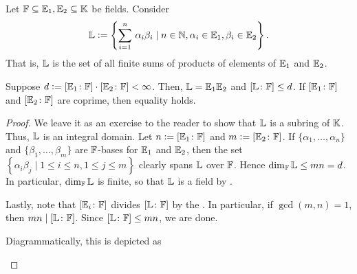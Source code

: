 \begin{prop}
    Let $\mathbb{F} \subseteq \mathbb{E}_1, \mathbb{E}_2 \subseteq \mathbb{K}$ be fields. Consider
    \[
        \mathbb{L} \vcentcolon= \left\{ \sum_{i=1}^n \, \alpha_i \beta_i \mid n \in \mathbb{N}, \alpha_i \in \mathbb{E}_1, \beta_i \in \mathbb{E}_2 \right\}.
    \]
    That is, $\mathbb{L}$ is the set of all finite sums of products of elements of $\mathbb{E}_1$ and $\mathbb{E}_2$.
    
    Suppose $d \vcentcolon= [\mathbb{E}_1 \colon \mathbb{F}] \cdot [\mathbb{E}_2 \colon \mathbb{F}] < \infty$. Then, $\mathbb{L} = \mathbb{E}_1\mathbb{E}_2$ and $[\mathbb{L} \colon \mathbb{F}] \leq d$. If $[\mathbb{E}_1 \colon \mathbb{F}]$ and $[\mathbb{E}_2 \colon \mathbb{F}]$ are coprime, then equality holds.
\end{prop}

\begin{proof}
    We leave it as an exercise to the reader to show that $\mathbb{L}$ is a subring of $\mathbb{K}$. Thus, $\mathbb{L}$ is an integral domain. Let $n \vcentcolon= [\mathbb{E}_1 \colon \mathbb{F}]$ and $m \vcentcolon= [\mathbb{E}_2 \colon \mathbb{F}]$. If $\{\alpha_1, \ldots, \alpha_n\}$ and $\{\beta_1, \ldots, \beta_m\}$ are $\mathbb{F}$-bases for $\mathbb{E}_1$ and $\mathbb{E}_2$, then the set $\left\{ \alpha_i \beta_j \mid 1 \leq i \leq n, 1 \leq j \leq m \right\}$ clearly spans $\mathbb{L}$ over $\mathbb{F}$. Hence $\dim_{\mathbb{F}}\mathbb{L} \leq mn = d$. In particular, $\dim_{\mathbb{F}}\mathbb{L}$ is finite, so that $\mathbb{L}$ is a field by . 
    
    Lastly, note that $[\mathbb{E}_i \colon \mathbb{F}]$ divides $[\mathbb{L} \colon \mathbb{F}]$ by the . In particular, if $\gcd(m,n) = 1$, then $mn \mid [\mathbb{L} \colon \mathbb{F}]$. Since $[\mathbb{L} \colon \mathbb{F}] \leq mn$, we are done.
    
    Diagrammatically, this is depicted as
\begin{center}
    

\end{center}
\end{proof}


